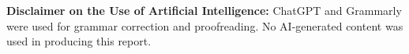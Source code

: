 \documentclass[ITR, MA, english, final]{LSR_thesis}
\begin{document}
\fi
\newpage

\phantom{u}
\begin{abstract}

\end{abstract}
\newpage
\textbf{Disclaimer on the Use of Artificial Intelligence:} ChatGPT and Grammarly
were used for grammar correction and proofreading. No AI-generated content was
used in producing this report.
\phantom{u}
\phantom{1}\vspace{6cm}
\begin{center}
\end{center}

\pagestyle{fancy}

\tableofcontents 

\ifLSRITRtutorial
	
\fi

%







\end{document}
